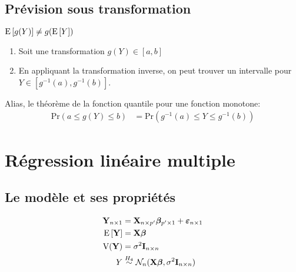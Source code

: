 \documentclass[10pt, french]{article}
\begin{document}
\begin{multicols*}{3}
\subsection*{Prévision sous transformation}
$\mathrm{E} \left[ g(Y) \right] \not = g(\mathrm{E} \left[ Y \right])$
\begin{enumerate}
	\item[] Soit une transformation $g(Y) \in [a, b]$
	\item[] En appliquant la transformation inverse, on peut trouver un intervalle pour $Y\in [g^{-1}(a), g^{-1}(b)]$.
\end{enumerate}
Alias, le théorème de la fonction quantile pour une fonction monotone:
\begin{align*}
	\text{Pr}(a \le g(Y) \le b) &= \text{Pr}(g^{-1}(a) \le Y \le g^{-1}(b)) 
\end{align*}


\section{Régression linéaire multiple}
\subsection*{Le modèle et ses propriétés}
\begin{align*}
\mathbf{Y}_{n \times 1} &= \mathbf{X}_{n \times p'} \bm{\beta}_{p' \times 1} + \bm{\varepsilon}_{n \times 1} \\
\mathrm{E} \left[ \mathbf{Y} \right]	&= \mathbf{X} \bm{\beta} \\
\text{V}({\mathbf{Y}}) &= \sigma^2 \mathbf{I}_{n \times n} \\
Y &\overset{H_4}{\sim} \mathcal{N}_n(\mathbf{X} \bm{\beta}, \sigma^2 \mathbf{I}_{n \times n}) \\
\end{align*}


\end{multicols*}
\end{document}
